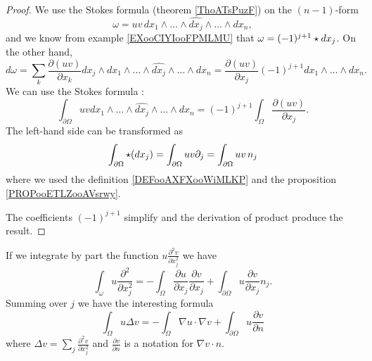 \begin{proof}
    We use the Stokes formula (theorem \ref{ThoATsPuzF}) on the \( (n-1)\)-form
    \begin{equation}
        \omega=uv\,dx_1\wedge\ldots\wedge\widehat{dx_j}\wedge\ldots\wedge dx_n,
    \end{equation}
    and we know from example \ref{EXooCIYIooFPMLMU} that \( \omega=(-1)^{j+1}\star dx_j\). On the other hand,
    \begin{equation}
        d\omega=\sum_k\frac{ \partial (uv) }{ \partial x_k }dx_j\wedge dx_1\wedge\ldots\wedge\widehat{dx_j}\wedge\ldots\wedge dx_n=\frac{ \partial (uv) }{ \partial x_j }(-1)^{j+1}dx_1\wedge\ldots\wedge dx_n.
    \end{equation}
    We can use the Stokes formula :
    \begin{equation}
        \int_{\partial \Omega} uv dx_1\wedge\ldots\wedge\widehat{dx_j}\wedge\ldots\wedge dx_n=  (-1)^{j+1} \int_{\Omega}\frac{ \partial (uv) }{ \partial x_j }.
    \end{equation}
    The left-hand side can be transformed as
    \begin{equation}
        \int_{\partial\Omega}\star(dx_j)=\int_{\partial\Omega}uv\partial_j=\int_{\partial\Omega}uv\,n_j
    \end{equation}
    where we used the definition \ref{DEFooAXFXooWiMLKP} and the proposition \ref{PROPooETLZooAVsrwy}.

    The coefficients \( (-1)^{j+1}\) simplify and the derivation of product produce the result.
\end{proof}

If we integrate by part the function \( u\frac{ \partial^2 v }{ \partial x_j^2 }\) we have
\begin{equation}
    \int_{\omega}u\frac{ \partial^2 }{ \partial x_j^2 }=-\int_{\Omega}\frac{ \partial u }{ \partial x_j }\frac{ \partial v }{ \partial x_j }+\int_{\partial \Omega}u\frac{ \partial v }{ \partial x_j }n_j.
\end{equation}
Summing over \( j\) we have the interesting formula
\begin{equation}        \label{EQooJLDTooIMtxEX}
    \int_{\Omega}u\Delta v=-\int_{\Omega}\nabla u\cdot\nabla v+\int_{\partial \Omega}u\frac{ \partial v }{ \partial n }
\end{equation}
where \( \Delta v=\sum_j\frac{ \partial^2v }{ \partial x_j^2 }\) and \( \frac{ \partial v }{ \partial n }\) is a notation for \( \nabla v\cdot n\).


